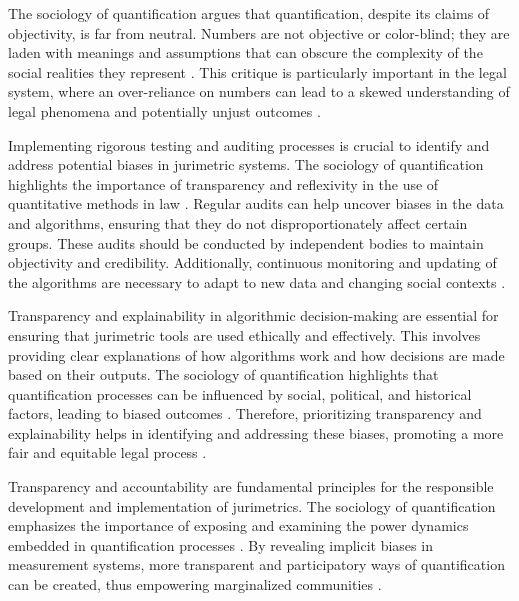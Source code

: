 The sociology of quantification argues that quantification, despite its claims of objectivity, is far from neutral. Numbers are not objective or color-blind; they are laden with meanings and assumptions that can obscure the complexity of the social realities they represent \cite{10.5040/9781350220645,10.1590/data.2022.65.3.267}. This critique is particularly important in the legal system, where an over-reliance on numbers can lead to a skewed understanding of legal phenomena and potentially unjust outcomes \cite{10.1057/s41599-020-00557-0, de2010jurimetrics}.

Implementing rigorous testing and auditing processes is crucial to identify and address potential biases in jurimetric systems. The sociology of quantification highlights the importance of transparency and reflexivity in the use of quantitative methods in law \cite{10.1007/s11186-021-09453-1,10.1057/s41599-020-0396-5}. Regular audits can help uncover biases in the data and algorithms, ensuring that they do not disproportionately affect certain groups. These audits should be conducted by independent bodies to maintain objectivity and credibility. Additionally, continuous monitoring and updating of the algorithms are necessary to adapt to new data and changing social contexts \cite{10.1007/s11186-021-09453-1,10.1057/s41599-020-0396-5}.

Transparency and explainability in algorithmic decision-making are essential for ensuring that jurimetric tools are used ethically and effectively. This involves providing clear explanations of how algorithms work and how decisions are made based on their outputs. The sociology of quantification highlights that quantification processes can be influenced by social, political, and historical factors, leading to biased outcomes \cite{10.1007/s11186-021-09453-1,loevinger1959}. Therefore, prioritizing transparency and explainability helps in identifying and addressing these biases, promoting a more fair and equitable legal process \cite{10.1007/s11186-021-09453-1,loevinger1959}.

Transparency and accountability are fundamental principles for the responsible development and implementation of jurimetrics. The sociology of quantification emphasizes the importance of exposing and examining the power dynamics embedded in quantification processes \cite{10.1057/s41599-020-00557-0,10.1080/07329113.2015.1046739}. By revealing implicit biases in measurement systems, more transparent and participatory ways of quantification can be created, thus empowering marginalized communities \cite{10.1057/s41599-020-00557-0,10.1080/07329113.2015.1046739}.

